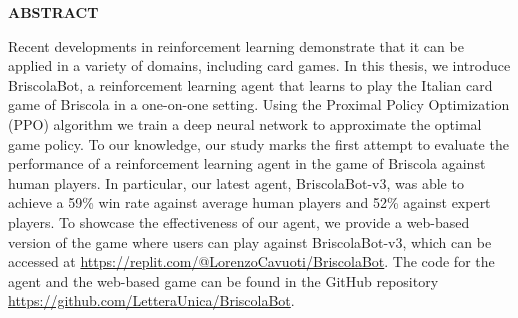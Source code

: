 \begin{center}
    \bf ABSTRACT
\end{center}
Recent developments in reinforcement learning demonstrate that it can be applied in a variety of domains, including card games. In this thesis, we introduce BriscolaBot, a reinforcement learning agent that learns to play the Italian card game of Briscola in a one-on-one setting. Using the Proximal Policy Optimization (PPO) algorithm we train a deep neural network to approximate the optimal game policy. To our knowledge, our study marks the first attempt to evaluate the performance of a reinforcement learning agent in the game of Briscola against human players. In particular, our latest agent, BriscolaBot-v3, was able to achieve a 59\% win rate against average human players and 52\% against expert players. To showcase the effectiveness of our agent, we provide a web-based version of the game where users can play against BriscolaBot-v3, which can be accessed at \url{https://replit.com/@LorenzoCavuoti/BriscolaBot}. The code for the agent and the web-based game can be found in the GitHub repository \url{https://github.com/LetteraUnica/BriscolaBot}.